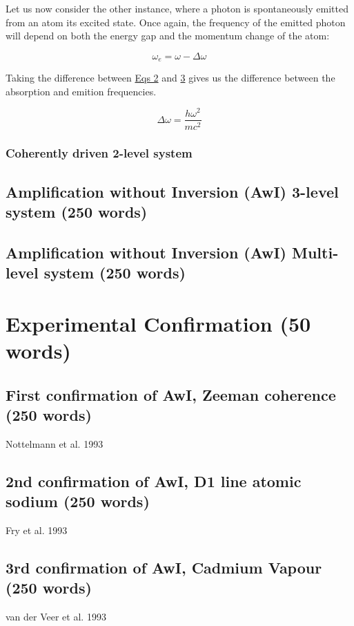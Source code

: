 \documentclass{article}
\begin{document}
Let us now consider the other instance, where a photon is spontaneously emitted from an atom its excited state. Once again, the frequency of the emitted photon will depend on both the energy gap and the momentum change of the atom:

\begin{equation}
\omega_{e}=\omega-\Delta\omega
\end{equation}\label{eq:3}

Taking the difference between \hyperref[eq:2]{Eqs 2} and \hyperref[eq:3]{3} gives us the difference between the absorption and emition frequencies.

\begin{equation}
\Delta\omega = \frac{h\omega^2}{mc^2}
\end{equation}\label{eq:4}


\subsubsection{Coherently driven 2-level system}
\subsection{Amplification without Inversion (AwI) 3-level system (250 words)}
\subsection{Amplification without Inversion (AwI) Multi-level system (250 words)}

\section{Experimental Confirmation (50 words)}
\subsection{First confirmation of AwI, Zeeman coherence (250 words)}
Nottelmann et al. 1993 \cite{Nottelmann1993}
\subsection{2nd confirmation of AwI, D1 line atomic sodium (250 words)}
Fry et al. 1993 \cite{PhysRevLett.70.3235}
\subsection{3rd confirmation of AwI, Cadmium Vapour (250 words)}
van der Veer et al. 1993 \cite{PhysRevLett.70.3243}
\end{document}
